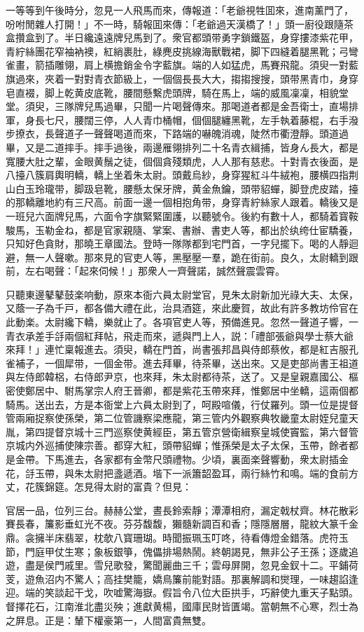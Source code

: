 一等等到午後時分，忽見一人飛馬而來，傳報道：「老爺視牲囬來，進南薰門了，吩咐閒雜人打開！」不一時，騎報囬來傳：「老爺過天漢橋了！」頭一廚役跟隨茶盒攢盒到了。半日纔遠遠牌兒馬到了。衆官都頭带勇字鎖鐵盔，身穿摟漆紫花甲，青紵絲團花窄袖衲襖，紅綃裹肚，綠麂皮挑線海獸戰裙，脚下四縫着腿黑靴；弓彎雀畫，箭插雕翎，肩上横擔銷金令字藍旗。端的人如猛虎，馬賽飛龍。須臾一對藍旗過來，夾着一對對青衣節級上，一個個長長大大，搊搊搜搜，頭带黑青巾，身穿皂直裰，脚上乾黄皮底靴，腰間懸繫虎頭牌，騎在馬上，端的威風凜凜，相貌堂堂。須臾，三隊牌兒馬過畢，只聞一片喝聲傳來。那喝道者都是金吾衛士，直場排軍，身長七尺，腰闊三停，人人青巾桶帽，個個腿纏黑靴，左手執着藤棍，右手潑步撩衣，長聲道子一聲聲喝道而來，下路端的嚇魄消魂，陡然市衢澄靜。頭道過畢，又是二道摔手。摔手過後，兩邊雁翎排列二十名青衣緝捕，皆身ん長大，都是寬腰大肚之輩，金眼黄鬚之徒，個個貪殘類虎，人人那有慈悲。十對青衣後面，是八擡八簇肩輿明轎，轎上坐着朱太尉。頭戴烏紗，身穿猩紅斗牛絨袍，腰横四指荆山白玉玲瓏带，脚趿皂靴，腰懸太保牙牌，黄金魚鑰，頭带貂蟬，脚登虎皮踏，擡的那轎離地約有三尺高。前面一邊一個相抱角带，身穿青紵絲家人跟着。轎後又是一班兒六面牌兒馬，六面令字旗緊緊圍護，以聽號令。後約有數十人，都騎着寳鞍駿馬，玉勒金ね，都是官家親隨、掌案、書辦、書吏人等，都出於纨绔仕宦驕養，只知好色貪財，那曉王章國法。登時一隊隊都到宅門首，一字兒擺下。喝的人靜迴避，無一人聲嗽。那來見的官吏人等，黑壓壓一羣，跪在街前。良久，太尉轎到跟前，左右喝聲：「起來伺候！」那衆人一齊聲諾，誠然聲震雲霄。

只聽東邊鼕鼕鼓楽响動，原來本衙六員太尉堂官，見朱太尉新加光祿大夫、太保，又蔭一子為千戸，都各備大禮在此，治具酒筵，來此慶賀，故此有許多教坊伶官在此動楽。太尉纔下轎，樂就止了。各項官吏人等，預備進見。忽然一聲道子響，一青衣承差手㧱兩個紅拜帖，飛走而來，遞與門上人，説：「禮部張爺與學士蔡大爺來拜！」連忙稟報進去。須臾，轎在門首，尚書張邦昌與侍郎蔡攸，都是紅吉服孔雀補子，一個犀带，一個金带。進去拜畢，待茶畢，送出來。又是吏部尚書王祖道與左侍郎韓梠，右侍郎尹京，也來拜，朱太尉都待茶，送了。又是皇親嘉國公、樞密使鄭居中、駙馬掌宗人府王晉卿，都是紫花玉帶來拜，惟鄭居中坐轎，這兩個都騎馬。送出去，方是本衙堂上六員太尉到了，呵殿喧儀，行仗羅列。頭一位是提督管兩廂捉察使孫榮，第二位管譏察梁應龍，第三管内外觀察典牧畿童太尉姪兒童天胤，第四提督京城十三門巡察使黄經臣，第五管京營衛緝察皇城使竇監，第六督管京城内外巡捕使陳宗善。都穿大紅，頭帶貂蟬；惟孫榮是太子太保，玉帶，餘者都是金帶。下馬進去，各家都有金幣尺頭禮物。少頃，裏面楽聲響動，衆太尉插金花，㧱玉帶，與朱太尉把盞遞酒。堦下一派簫韶盈耳，兩行絲竹和鳴。端的食前方丈，花簇錦筵。怎見得太尉的富貴？但見：

\begin{myquote}
官居一品，位列三台。赫赫公堂，晝長鈴索靜；潭潭相府，漏定戟杖齊。林花散彩賽長春，簾影垂虹光不夜。芬芬馥馥，獺髓新調百和香；隱隱層層，龍紋大篆千金鼎。衾擁半床翡翠，枕欹八寳珊瑚。時聞振珮玉叮咚，待看傳燈金錯落。虎符玉節，門庭甲仗生寒；象板銀箏，傀儡排場熱鬧。終朝謁見，無非公子王孫；逐歲追遊，盡是侯門戚里。雪兒歌發，驚聞麗曲三千；雲母屏開，忽見金釵十二。平鋪荷芰，遊魚沼内不驚人；高挂樊籠，嬌鳥簾前能對語。那裏解調和爕理，一味趨諂逢迎。端的笑談起干戈，吹嘘驚海嶽。假旨令八位大臣拱手，巧辭使九重天子點頭。督擇花石，江南淮北盡災殃；進獻黄楊，國庫民財皆匱竭。當朝無不心寒，烈士為之屛息。正是：輦下權豪第一，人間富貴無雙。
\end{myquote}

